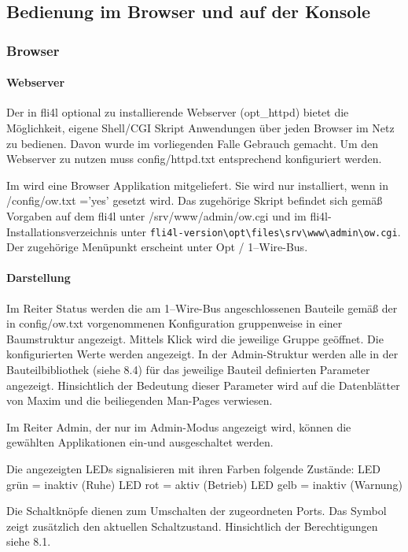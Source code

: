 \subsection{Bedienung im Browser und auf der Konsole}

{
\subsubsection{Browser}
}
\paragraph{Webserver}
Der in fli4l optional zu installierende Webserver (opt\_httpd) bietet die Möglichkeit,
eigene Shell/CGI Skript Anwendungen über jeden Browser im Netz zu bedienen. Davon
wurde im vorliegenden Falle Gebrauch gemacht. Um den Webserver zu nutzen
muss config/httpd.txt entsprechend konfiguriert werden.

Im  wird eine Browser Applikation mitgeliefert. Sie wird nur installiert, wenn
in /config/ow.txt ='yes' gesetzt wird.
Das zugehörige Skript befindet sich gemäß Vorgaben auf dem fli4l unter
/srv/www/admin/ow.cgi und im fli4l-Installationsverzeichnis unter
\verb!fli4l-version\opt\files\srv\www\admin\ow.cgi!. Der zugehörige Menüpunkt erscheint unter \glqq{}Opt /
1--Wire-Bus\grqq{}.

\paragraph{Darstellung}
Im Reiter \glqq{}Status\grqq{} werden die am 1--Wire-Bus angeschlossenen Bauteile gemäß der
in config/ow.txt vorgenommenen Konfiguration gruppenweise in einer Baumstruktur
angezeigt. Mittels \glq{}Klick\grq{} wird die jeweilige Gruppe geöffnet. Die konfigurierten Werte
werden angezeigt. In der Admin-Struktur werden alle in der Bauteilbibliothek (siehe
8.4) für das jeweilige Bauteil definierten Parameter angezeigt. Hinsichtlich der Bedeutung
dieser Parameter wird auf die Datenblätter von Maxim und die beiliegenden
Man-Pages verwiesen.

Im Reiter \glqq{}Admin\grqq{}, der nur im Admin-Modus angezeigt wird, können die gewählten
Applikationen ein-und ausgeschaltet werden.

Die angezeigten LEDs signalisieren mit ihren Farben folgende Zustände:
LED grün = inaktiv (Ruhe)
LED rot = aktiv (Betrieb)
LED gelb = inaktiv (Warnung)


Die Schaltknöpfe dienen zum Umschalten der zugeordneten Ports. Das Symbol zeigt
zusätzlich den aktuellen Schaltzustand. Hinsichtlich der Berechtigungen siehe 8.1.


